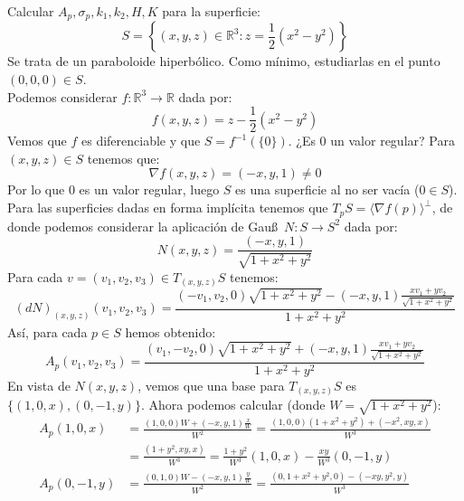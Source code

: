 \begin{ejercicio}
    Calcular $A_p, \sigma_p, k_1, k_2, H, K$ para la superficie:
    \begin{equation*}
        S = \left\{(x,y,z)\in \mathbb{R}^3 : z = \frac{1}{2}(x^2-y^2)\right\}
    \end{equation*}
    Se trata de un paraboloide hiperbólico. Como mínimo, estudiarlas en el punto $(0,0,0)\in S$.\\

    \noindent
    Podemos considerar $f:\mathbb{R}^3\to\mathbb{R}$ dada por:
    \begin{equation*}
        f(x,y,z) = z-\frac{1}{2}(x^2-y^2)
    \end{equation*}
    Vemos que $f$ es diferenciable y que $S = f^{-1}(\{0\})$. ¿Es 0 un valor regular? Para $(x,y,z)\in S$ tenemos que:
    \begin{equation*}
        \nabla f(x,y,z) = (-x,y,1)\neq 0
    \end{equation*}
    Por lo que $0$ es un valor regular, luego $S$ es una superficie al no ser vacía ($0\in S$). Para las superficies dadas en forma implícita tenemos que $T_pS = \langle \nabla f(p) \rangle^\perp $, de donde podemos considerar la aplicación de Gau\ss\ $N:S\to S^2$ dada por:
    \begin{equation*}
        N(x,y,z) = \frac{(-x,y,1)}{\sqrt{1+x^2+y^2}}
    \end{equation*}
    Para cada $v=(v_1,v_2,v_3)\in T_{(x,y,z)}S$ tenemos:
    \begin{equation*}
        (dN)_{(x,y,z)}(v_1,v_2,v_3) = \frac{(-v_1,v_2,0)\sqrt{1+x^2+y^2} - (-x,y,1)\frac{xv_1+yv_2}{\sqrt{1+x^2+y^2}}}{1+x^2+y^2}
    \end{equation*}
    Así, para cada $p\in S$ hemos obtenido:
    \begin{equation*}
        A_p(v_1,v_2,v_3) = \frac{(v_1,-v_2,0)\sqrt{1+x^2+y^2} + (-x,y,1)\frac{xv_1+yv_2}{\sqrt{1+x^2+y^2}}}{1+x^2+y^2}
    \end{equation*}
    En vista de $N(x,y,z)$, vemos que una base para $T_{(x,y,z)}S$ es $\{(1,0,x), (0,-1,y)\}$. Ahora podemos calcular (donde $W = \sqrt{1+x^2+y^2}$):
    \begin{align*}
        A_p(1,0,x) &= \frac{(1,0,0)W + (-x,y,1)\frac{x}{W}}{W^2} = \frac{(1,0,0)(1+x^2+y^2)+(-x^2,xy,x)}{W^3} \\
                   &= \frac{(1+y^2,xy,x)}{W^3} = \frac{1+y^2}{W^3}(1,0,x) - \frac{xy}{W^3}(0,-1,y) \\
        A_p(0,-1,y) &= \frac{(0,1,0)W-(-x,y,1)\frac{y}{W}}{W^2} = \frac{(0,1+x^2+y^2,0)-(-xy,y^2,y)}{W^3} \\

\end{align*}
\end{ejercicio}
